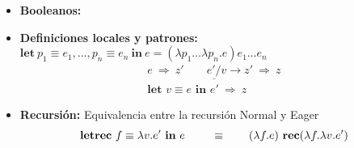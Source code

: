 \begin{itemize}
\begin{itemize}
\begin{multicols}{3}
              \[i'\neq 0\]
            \end{multicols}
          \end{itemize}
        \item \textbf{Booleanos:}
          \begin{itemize}
            \setlength{\columnsep}{.4cm}
          \end{itemize}
        \item \textbf{Definiciones locales y patrones:} $\textbf{let}\ p_1 \equiv e_1, \ldots, p_n \equiv e_n\ \textbf{in}\ e = (\lambda p_1\ldots\lambda p_n.e) e_1 \ldots e_n$
          \[\begin{array}{c}
            \underline{e\ \Rightarrow\  z' \qquad e'/v \to z'\ \Rightarrow\ z} \\
            \textbf{let } v \equiv e \textbf{ in } e' \ \Rightarrow\ z
            \end{array}\]
        \item \textbf{Recursión:} Equivalencia entre la recursión Normal y Eager
          \[
            \textbf{letrec}\ f \equiv \lambda v.e'\ \textbf{in}\ e\  \qquad  \equiv \qquad (\lambda f . e) \ \textbf{rec}(\lambda f . \lambda v. e')
          \]
      \end{itemize}
    
